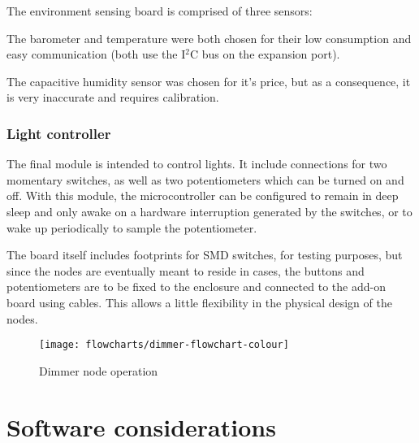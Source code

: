 The environment sensing board is comprised of three sensors:



The barometer and temperature were both chosen for their low consumption and
easy communication (both use the I$^{2}$C bus on the expansion port).

The capacitive humidity sensor was chosen for it's price, but as a consequence,
it is very inaccurate and requires calibration.

\subsubsection{Light controller}

The final module is intended to control lights. It include connections for two
momentary switches, as well as two potentiometers which can be turned on and
off. With this module, the microcontroller can be configured to remain in deep
sleep and only awake on a hardware interruption generated by the switches, or to
wake up periodically to sample the potentiometer.

The board itself includes footprints for SMD switches, for testing purposes, but
since the nodes are eventually meant to reside in cases, the buttons and
potentiometers are to be fixed to the enclosure and connected to the add-on
board using cables. This allows a little flexibility in the physical design of
the nodes.

\begin{figure}[!h]
  \begin{center}
    \texttt{[image: flowcharts/dimmer-flowchart-colour]}
  \end{center}
  \caption{Dimmer node operation}
  \label{fig:dimmer-flowchart}
\end{figure}





\section{Software considerations}

